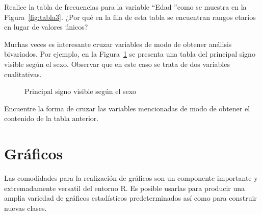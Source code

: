 \documentclass{prob}
\begin{document}
\begin{problema}
	\begin{parte}
		Realice la tabla de frecuencias para la variable \textquotedblleft Edad \textquotedblright como se muestra en la Figura~\ref{fig:tabla3}. ¿Por qué en la fila de esta tabla se encuentran rangos etarios en lugar de valores únicos? \\		
		
		\noindent{}	

	\end{parte}
		
    \end{problema}
        
    \begin{problema}
    Muchas veces es interesante cruzar variables de modo de obtener análisis bivariados. Por ejemplo, en la Figura~\ref{fig:ej3} se presenta una tabla del principal signo visible según el sexo. Observar que en este caso se trata de dos variables cualitativas.\\
\begin{figure}[!ht]
    \centering
    
    \caption{Principal signo visible según el sexo}
    \label{fig:ej3}
\end{figure}

	Encuentre la forma de cruzar las variables mencionadas de modo de obtener el contenido de la tabla anterior.\\
	
\noindent{}	
	
	\end{problema}
\section*{Gráficos}
Las comodidades para la realización de gráficos son un componente importante y extremadamente versatil del entorno R. Es posible usarlas para producir una amplia variedad de gráficos estadísticos predeterminados así como para construir nuevas clases.
\end{document}
